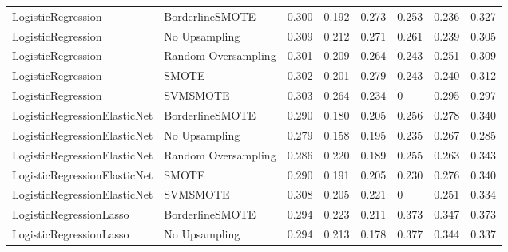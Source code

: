 \begin{tabular}{llllllll}
          LogisticRegression &     BorderlineSMOTE & 0.300 &                     0.192 &                 0.273 &                  0.253 &                                   0.236 &     0.327 \\
          LogisticRegression &       No Upsampling & 0.309 &                     0.212 &                 0.271 &                  0.261 &                                   0.239 &     0.305 \\
          LogisticRegression & Random Oversampling & 0.301 &                     0.209 &                 0.264 &                  0.243 &                                   0.251 &     0.309 \\
          LogisticRegression &               SMOTE & 0.302 &                     0.201 &                 0.279 &                  0.243 &                                   0.240 &     0.312 \\
          LogisticRegression &            SVMSMOTE & 0.303 &                     0.264 &                 0.234 &                      0 &                                   0.295 &     0.297 \\
LogisticRegressionElasticNet &     BorderlineSMOTE & 0.290 &                     0.180 &                 0.205 &                  0.256 &                                   0.278 &     0.340 \\
LogisticRegressionElasticNet &       No Upsampling & 0.279 &                     0.158 &                 0.195 &                  0.235 &                                   0.267 &     0.285 \\
LogisticRegressionElasticNet & Random Oversampling & 0.286 &                     0.220 &                 0.189 &                  0.255 &                                   0.263 &     0.343 \\
LogisticRegressionElasticNet &               SMOTE & 0.290 &                     0.191 &                 0.205 &                  0.230 &                                   0.276 &     0.340 \\
LogisticRegressionElasticNet &            SVMSMOTE & 0.308 &                     0.205 &                 0.221 &                      0 &                                   0.251 &     0.334 \\
     LogisticRegressionLasso &     BorderlineSMOTE & 0.294 &                     0.223 &                 0.211 &                  0.373 &                                   0.347 &     0.373 \\
     LogisticRegressionLasso &       No Upsampling & 0.294 &                     0.213 &                 0.178 &                  0.377 &                                   0.344 &     0.337 \\

\end{tabular}
